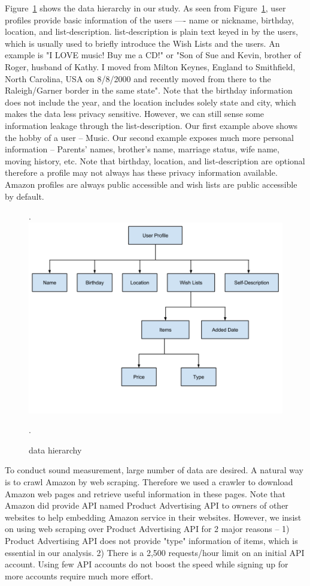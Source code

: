\documentclass{llncs}
\begin{document}
Figure~\ref{data_struct} shows the data hierarchy in our study. As seen from Figure~\ref{data_struct}, user profiles provide basic information of the users —- name or nickname, birthday, location, and list-description. list-description is plain text keyed in by the users, which is usually used to briefly introduce the Wish Lists and the users. An example is "I LOVE music! Buy me a CD!" or "Son of Sue and Kevin, brother of Roger, husband of Kathy. I moved from Milton Keynes, England to Smithfield, North Carolina, USA on 8/8/2000 and recently moved from there to the Raleigh/Garner border in the same state". Note that the birthday information does not include the year, and the location includes solely state and city, which makes the data less privacy sensitive. However, we can still sense some information leakage through the list-description. Our first example above shows the hobby of a user -- Music. Our second example exposes much more personal information -- Parents' names, brother's name, marriage status, wife name, moving history, etc. Note that birthday, location, and list-description are optional therefore a profile may not always has these privacy information available. Amazon profiles are always public accessible and wish lists are public accessible by default. 
\begin{figure}[H].
\centering
\includegraphics[width=.75\textwidth]{data_struct.png}
\caption{data hierarchy}.
\label{data_struct}
\end{figure}
To conduct sound measurement, large number of data are desired. A natural way is to crawl Amazon by web scraping. Therefore we used a crawler to download Amazon web pages and retrieve useful information in these pages. Note that Amazon did provide API named Product Advertising API to owners of other websites to help embedding Amazon service in their websites. However, we insist on using web scraping over Product Advertising API for 2 major reasons -- 1) Product Advertising API does not provide "type" information of items, which is essential in our analysis. 2) There is a 2,500 requests/hour limit on an initial API account. Using few API accounts do not boost the speed while signing up for more accounts require much more effort.
\end{document}
